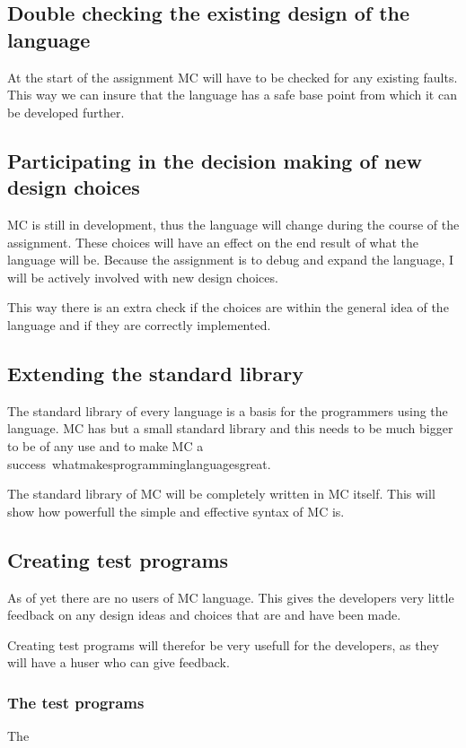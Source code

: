 \subsection{Double checking the existing design of the language}
At the start of the assignment MC will have to be checked for any existing faults.
This way we can insure that the language has a safe base point from which it can be developed further.

\subsection{Participating in the decision making of new design choices}
MC is still in development, thus the language will change during the course of the assignment.
These choices will have an effect on the end result of what the language will be.
Because the assignment is to debug and expand the language, I will be actively involved with new design choices.

This way there is an extra check if the choices are within the general idea of the language and if they are correctly implemented.

\subsection{Extending the standard library}
The standard library of every language is a basis for the programmers using the language.
MC has but a small standard library and this needs to be much bigger to be of any use and to make MC a success~\cite{}whatmakesprogramminglanguagesgreat.

The standard library of MC will be completely written in MC itself.
This will show how powerfull the simple and effective syntax of MC is.

\subsection{Creating test programs}
As of yet there are no users of MC language.
This gives the developers very little feedback on any design ideas and choices that are and have been made.

Creating test programs will therefor be very usefull for the developers, as they will have a huser who can give feedback.

\subsubsection{The test programs}
The

